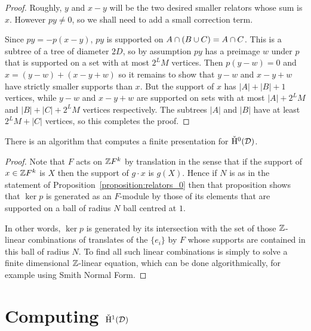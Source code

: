 \begin{proof}
Roughly, $y$ and $x-y$ will be the two desired smaller relators whose sum is $x$.
However $py \neq 0$, so we shall need to add a small correction term.

Since $py = -p(x-y)$, $py$ is supported on $A \cap (B \cup C) = A \cap C$.
This is a subtree of a tree of diameter $2D$, so by assumption $py$ has a preimage $w$ under $p$ that is supported on a set with at most $2^LM$ vertices.
Then $p(y-w) = 0$ and $x = (y-w) + (x-y+w)$ so it remains to show that $y-w$ and $x-y+w$ have strictly smaller supports than $x$.
But the support of $x$ has $|A| + |B| + 1$ vertices, while $y-w$ and $x-y+w$ are supported on sets with at most $|A| + 2^LM$ and $| B | + |C| + 2^LM$ vertices respectively.
The subtrees $|A|$ and $|B|$ have at least $2^LM + |C|$ vertices, so this completes the proof.
\end{proof}

\begin{proposition} \label{proposition:computable_dimension_zero}
  There is an algorithm that computes a finite presentation for $\check{\mathrm{H}}{}^0(\mathcal{D})$.
\end{proposition}

\begin{proof}
Note that $F$ acts on $\mathbb{Z} F^k$ by translation in the sense that if the support of $x \in \mathbb{Z} F^k$ is $X$ then the support of $g\cdot x$ is $g(X)$.
Hence if $N$ is as in the statement of Proposition~\ref{proposition:relators_0} then that proposition shows that $\ker p$ is generated as an $F$-module by those of its elements that are supported on a ball of radius $N$ ball centred at $1$.

In other words, $\ker p$ is generated by its intersection with the set of those $\mathbb{Z}$-linear combinations of translates of the $\{ e_i\}$ by $F$ whose supports are contained in this ball of radius $N$.
To find all such linear combinations is simply to solve a finite dimensional $\mathbb{Z}$-linear equation, which can be done algorithmically, for example using Smith Normal Form.
\end{proof}

\section{Computing \texorpdfstring{$\check{\mathrm{H}}{}^1(\mathcal{D})$}{H1(D,Z)}} \label{section:dimension_1_cohomology}

